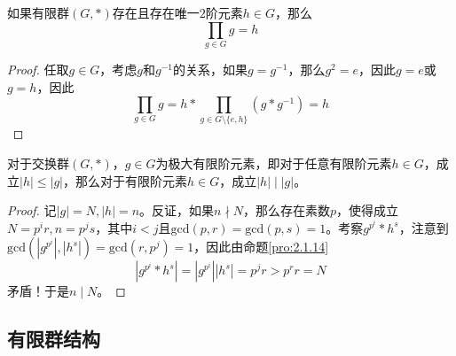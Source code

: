 \begin{proposition}
	如果有限群$(G,*)$存在且存在唯一$2$阶元素$h\in G$，那么
	$$
	\prod_{g\in G}g=h
	$$
\end{proposition}

\begin{proof}
	任取$g\in G$，考虑$g$和$g^{-1}$的关系，如果$g=g^{-1}$，那么$g^2=e$，因此$g=e$或$g=h$，因此
	$$
	\prod_{g\in G}g=h*\prod_{g\in G\setminus\{e,h\}}(g*g^{-1})=h
	$$
\end{proof}

\begin{proposition}
	对于交换群$(G,*)$，$g\in G$为极大有限阶元素，即对于任意有限阶元素$h\in G$，成立$|h|\le |g|$，那么对于有限阶元素$h\in G$，成立$|h|\mid |g|$。
\end{proposition}

\begin{proof}
	记$|g|=N,|h|=n$。反证，如果$n\nmid N$，那么存在素数$p$，使得成立$N=p^ir,n=p^js$，其中$i<j$且$\mathrm{gcd}(p,r)=\mathrm{gcd}(p,s)=1$。考察$g^{p^i}*h^s$，注意到$\mathrm{gcd}(|g^{p^i}|,|h^s|)=\mathrm{gcd}(r,p^j)=1$，因此由命题\ref{pro:2.1.14}
	$$
	\left| g^{p^i}*h^s \right|=| g^{p^i} || h^s |=p^jr>p^rr=N
	$$
	矛盾！于是$n\mid N$。
\end{proof}

\subsection{有限群结构}

\begin{table}[H]
	\centering
	\caption{有限群结构}
\end{table}

